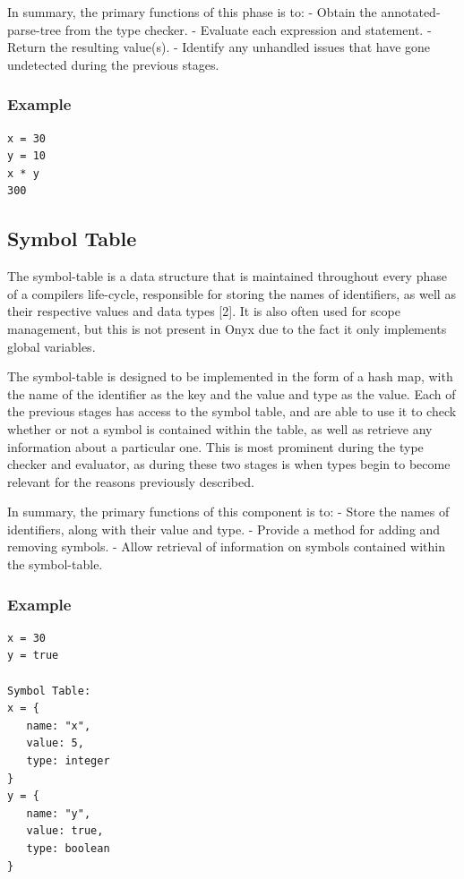 \documentclass[
]{report}
\begin{document}
In summary, the primary functions of this phase is to: - Obtain the
\gls{annotated-parse-tree} from the type checker. - Evaluate each \gls{expression}
and \gls{statement}. - Return the resulting value(s). - Identify any unhandled
issues that have gone undetected during the previous stages.

\subsubsection{Example}
\begin{verbatim}
x = 30
y = 10
x * y
300
\end{verbatim}

\subsection{Symbol Table}
The \gls{symbol-table} is a data structure that is maintained throughout every
phase of a compilers life-cycle, responsible for storing the names of
\glspl{identifier}, as well as their respective values and data types {[}2{]}.
It is also often used for scope management, but this is not present in
Onyx due to the fact it only implements global variables.

The \gls{symbol-table} is designed to be implemented in the form of a hash
map, with the name of the \gls{identifier} as the key and the value and type
as the value. Each of the previous stages has access to the symbol
table, and are able to use it to check whether or not a \gls{symbol} is
contained within the table, as well as retrieve any information about a
particular one. This is most prominent during the type checker and
evaluator, as during these two stages is when types begin to become
relevant for the reasons previously described.

In summary, the primary functions of this component is to: - Store the
names of \glspl{identifier}, along with their value and type. - Provide a
method for adding and removing \glspl{symbol}. - Allow retrieval of information
on \glspl{symbol} contained within the \gls{symbol-table}.

\subsubsection{Example}
\begin{verbatim}
x = 30
y = true

Symbol Table:
x = {
   name: "x",
   value: 5,
   type: integer
}
y = {
   name: "y",
   value: true,
   type: boolean
}
\end{verbatim}
\end{document}
